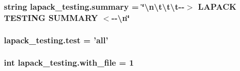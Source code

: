 \subsubsection[{summary}]{\setlength{\rightskip}{0pt plus 5cm}string lapack\+\_\+testing.\+summary = \char`\"{}\textbackslash{}n\textbackslash{}t\textbackslash{}t\textbackslash{}t-\/-\/$>$ L\+A\+P\+A\+C\+K T\+E\+S\+T\+I\+N\+G S\+U\+M\+M\+A\+R\+Y $<$-\/-\/\textbackslash{}{\bf n}\char`\"{}}\label{namespacelapack__testing_a38bbd488ad7e157fb4081072b0ea6e0c}
\hypertarget{namespacelapack__testing_a2f56496c4a316d0806ded6777fc7cb96}{}
\subsubsection[{test}]{\setlength{\rightskip}{0pt plus 5cm}lapack\+\_\+testing.\+test = '{\bf all}'}\label{namespacelapack__testing_a2f56496c4a316d0806ded6777fc7cb96}
\hypertarget{namespacelapack__testing_a2d078e384760a2e10c6b6595a16f7083}{}
\subsubsection[{with\+\_\+file}]{\setlength{\rightskip}{0pt plus 5cm}int lapack\+\_\+testing.\+with\+\_\+file = 1}\label{namespacelapack__testing_a2d078e384760a2e10c6b6595a16f7083}
